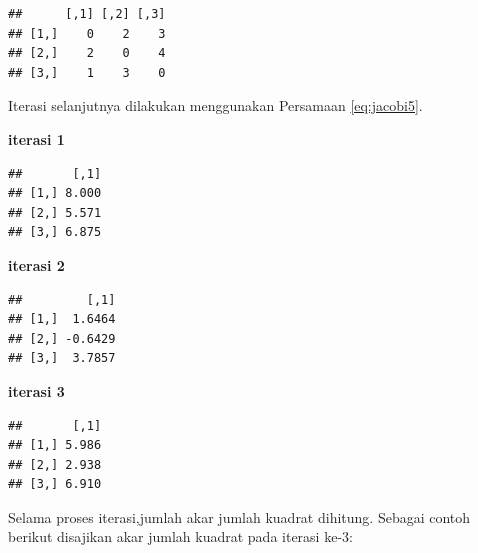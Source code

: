 \documentclass[]{book}
\newenvironment{Shaded}{\begin{snugshade}}{\end{snugshade}}
\newcommand{\NormalTok}[1]{#1}
\newcommand{\OperatorTok}[1]{\textcolor[rgb]{0.81,0.36,0.00}{\textbf{#1}}}
\newcommand{\StringTok}[1]{\textcolor[rgb]{0.31,0.60,0.02}{#1}}
\theoremstyle{definition}
\theoremstyle{definition}
\theoremstyle{definition}
\theoremstyle{remark}
\begin{document}
\begin{verbatim}
##      [,1] [,2] [,3]
## [1,]    0    2    3
## [2,]    2    0    4
## [3,]    1    3    0
\end{verbatim}

Iterasi selanjutnya dilakukan menggunakan Persamaan \eqref{eq:jacobi5}.

\textbf{iterasi 1}

\begin{Shaded}
\end{Shaded}

\begin{verbatim}
##       [,1]
## [1,] 8.000
## [2,] 5.571
## [3,] 6.875
\end{verbatim}

\textbf{iterasi 2}

\begin{Shaded}
\end{Shaded}

\begin{verbatim}
##         [,1]
## [1,]  1.6464
## [2,] -0.6429
## [3,]  3.7857
\end{verbatim}

\textbf{iterasi 3}

\begin{Shaded}
\end{Shaded}

\begin{verbatim}
##       [,1]
## [1,] 5.986
## [2,] 2.938
## [3,] 6.910
\end{verbatim}

Selama proses iterasi,jumlah akar jumlah kuadrat dihitung. Sebagai contoh berikut disajikan akar jumlah kuadrat pada iterasi ke-3:
\end{document}
